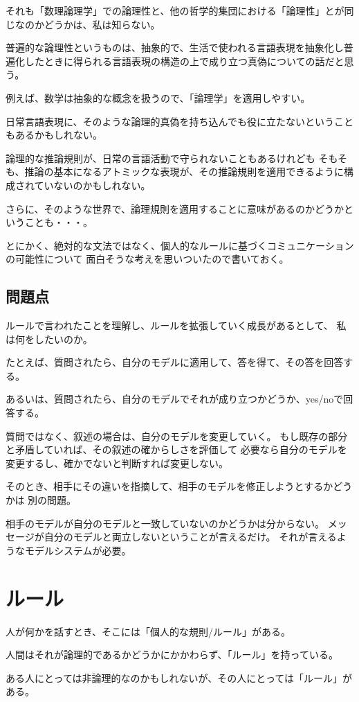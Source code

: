 \documentclass[10pt, oneside]{jarticle}   	%
\begin{document}
それも「数理論理学」での論理性と、他の哲学的集団における「論理性」とが同じなのかどうかは、私は知らない。

普遍的な論理性というものは、抽象的で、生活で使われる言語表現を抽象化し普遍化したときに得られる言語表現の構造の上で成り立つ真偽についての話だと思う。

例えば、数学は抽象的な概念を扱うので、「論理学」を適用しやすい。

日常言語表現に、そのような論理的真偽を持ち込んでも役に立たないということもあるかもしれない。

論理的な推論規則が、日常の言語活動で守られないこともあるけれども
そもそも、推論の基本になるアトミックな表現が、その推論規則を適用できるように構成されていないのかもしれない。

さらに、そのような世界で、論理規則を適用することに意味があるのかどうかということも・・・。

とにかく、絶対的な文法ではなく、個人的なルールに基づくコミュニケーションの可能性について
面白そうな考えを思いついたので書いておく。
\subsection{問題点}
ルールで言われたことを理解し、ルールを拡張していく成長があるとして、
私は何をしたいのか。

たとえば、質問されたら、自分のモデルに適用して、答を得て、その答を回答する。

あるいは、質問されたら、自分のモデルでそれが成り立つかどうか、yes/noで回答する。

質問ではなく、叙述の場合は、自分のモデルを変更していく。
もし既存の部分と矛盾していれば、その叙述の確からしさを評価して
必要なら自分のモデルを変更するし、確かでないと判断すれば変更しない。

そのとき、相手にその違いを指摘して、相手のモデルを修正しようとするかどうかは
別の問題。

相手のモデルが自分のモデルと一致していないのかどうかは分からない。
メッセージが自分のモデルと両立しないということが言えるだけ。
それが言えるようなモデルシステムが必要。

\section{ルール}
人が何かを話すとき、そこには「個人的な規則/ルール」がある。

人間はそれが論理的であるかどうかにかかわらず、「ルール」を持っている。

ある人にとっては非論理的なのかもしれないが、その人にとっては「ルール」がある。
\end{document}
